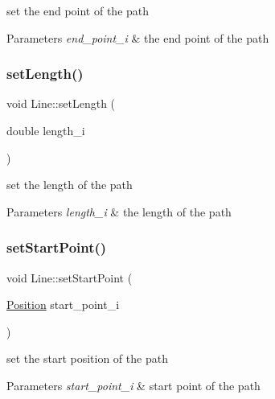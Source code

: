 set the end point of the path 


\begin{DoxyParams}{Parameters}
{\em end\+\_\+point\+\_\+i} & the end point of the path \\
\hline
\end{DoxyParams}
\mbox{\label{class_line_a387afc9536a3c054dec9eb54f45ea993}} 
\subsubsection{\texorpdfstring{set\+Length()}{setLength()}}
{\footnotesize\ttfamily void Line\+::set\+Length (\begin{DoxyParamCaption}\item[{double}]{length\+\_\+i }\end{DoxyParamCaption})}



set the length of the path 


\begin{DoxyParams}{Parameters}
{\em length\+\_\+i} & the length of the path \\
\hline
\end{DoxyParams}
\mbox{\label{class_line_a6356eecffc24d5016c9aa697611c3020}} 
\subsubsection{\texorpdfstring{set\+Start\+Point()}{setStartPoint()}}
{\footnotesize\ttfamily void Line\+::set\+Start\+Point (\begin{DoxyParamCaption}\item[{\mbox{\hyperlink{class_position}{Position}}}]{start\+\_\+point\+\_\+i }\end{DoxyParamCaption})}



set the start position of the path 


\begin{DoxyParams}{Parameters}
{\em start\+\_\+point\+\_\+i} & start point of the path \\
\hline
\end{DoxyParams}
\mbox{\label{class_line_a4976ad80d3fe4a789bac7a1916543edd}} 
